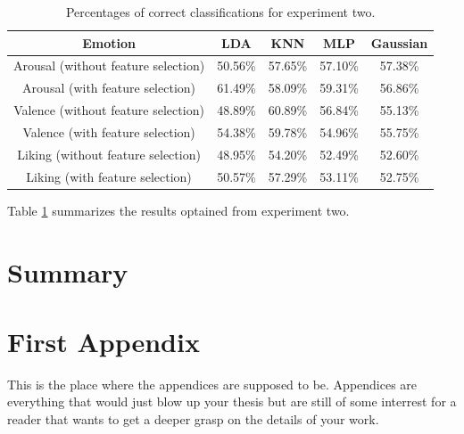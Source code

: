 \documentclass[12pt, a4paper, fleqn]{memoir}%
\begin{document}
\begin{table}[!h]
	\begin{tabular}{| c | c | c | c | c |}
		\hline \hline
		Emotion 				& LDA     & KNN     & MLP     & Gaussian \\
		\hline \hline
		Arousal (without feature selection)     & 50.56\% & 57.65\% & 57.10\% & 57.38\%  \\ \hline
		Arousal (with feature selection)	& 61.49\% & 58.09\% & 59.31\% & 56.86\%  \\ \hline
		\hline
		Valence (without feature selection)	& 48.89\% & 60.89\% & 56.84\% & 55.13\%  \\ \hline
		Valence (with feature selection)   	& 54.38\% & 59.78\% & 54.96\% & 55.75\%  \\ \hline
		\hline
		Liking  (without feature selection) 	& 48.95\% & 54.20\% & 52.49\% & 52.60\%  \\ \hline
		Liking  (with feature selection)     	& 50.57\% & 57.29\% & 53.11\% & 52.75\%  \\ \hline
		\hline
	\end{tabular}
	\caption{Percentages of correct classifications for experiment two.}
	\label{table:exp2}
\end{table}

Table \ref{table:exp2} summarizes the results optained from experiment two. 
\chapter{Summary}

{\small}

\appendix
\appendixpage*

\chapter{First Appendix}
\label{app:FirstAppendix}
This is the place where the appendices are supposed to be. Appendices are everything that would just blow up your thesis but are still of some interrest for a reader that wants to get a deeper grasp on the details of your work. 
\end{document}
